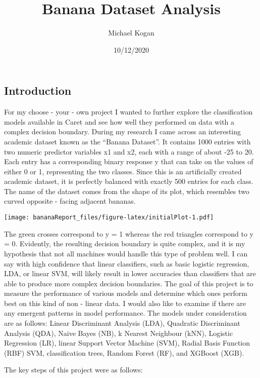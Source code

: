 \documentclass[
]{article}
\title{Banana Dataset Analysis}
\author{Michael Kogan}
\date{10/12/2020}
\begin{document}
\maketitle

\hypertarget{introduction}{%
\subsection{Introduction}\label{introduction}}

For my choose - your - own project I wanted to further explore the
classification models available in Caret and see how well they performed
on data with a complex decision boundary. During my research I came
across an interesting academic dataset known as the ``Banana Dataset''.
It contains 1000 entries with two numeric predictor variables x1 and x2,
each with a range of about -25 to 20. Each entry has a corresponding
binary response y that can take on the values of either 0 or 1,
representing the two classes. Since this is an artificially created
academic dataset, it is perfectly balanced with exactly 500 entries for
each class. The name of the dataset comes from the shape of its plot,
which resembles two curved opposite - facing adjacent bananas.

\texttt{[image: bananaReport\_files/figure-latex/initialPlot-1.pdf]}

The green crosses correspond to y = 1 whereas the red triangles
correspond to y = 0. Evidently, the resulting decision boundary is quite
complex, and it is my hypothesis that not all machines would handle this
type of problem well. I can say with high confidence that linear
classifiers, such as basic logistic regression, LDA, or linear SVM, will
likely result in lower accuracies than classifiers that are able to
produce more complex decision boundaries. The goal of this project is to
measure the performance of various models and determine which ones
perform best on this kind of non - linear data. I would also like to
examine if there are any emergent patterns in model performance. The
models under consideration are as follows: Linear Discriminant Analysis
(LDA), Quadratic Discriminant Analysis (QDA), Naive Bayes (NB), k
Nearest Neighbour (kNN), Logistic Regression (LR), linear Support Vector
Machine (SVM), Radial Basis Function (RBF) SVM, classification trees,
Random Forest (RF), and XGBoost (XGB).

The key steps of this project were as follows:
\end{document}
